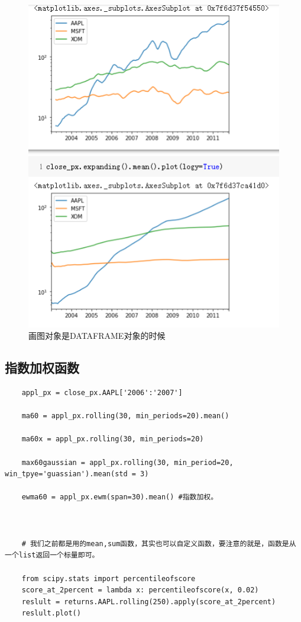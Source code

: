 \documentclass{article}
\begin{document}
\begin{figure}[tbhp]
	\centering
	\includegraphics[width=\linewidth]{fig/t5}
	\caption{画图对象是DATAFRAME对象的时候}
	\label{fig-rollingdataframe}
\end{figure}

\subsection{指数加权函数}

\begin{lstlisting}
	appl_px = close_px.AAPL['2006':'2007']
	
	ma60 = appl_px.rolling(30, min_periods=20).mean()
	
	ma60x = appl_px.rolling(30, min_periods=20)
	
	max60gaussian = appl_px.rolling(30, min_period=20, win_tpye='guassian').mean(std = 3)
	
	ewma60 = appl_px.ewm(span=30).mean() #指数加权。
	
	
	
	# 我们之前都是用的mean,sum函数，其实也可以自定义函数，要注意的就是，函数是从一个list返回一个标量即可。
	
	from scipy.stats import percentileofscore
	score_at_2percent = lambda x: percentileofscore(x, 0.02)
	reslult = returns.AAPL.rolling(250).apply(score_at_2percent)
	reslult.plot()
	
\end{lstlisting}
\end{document}
